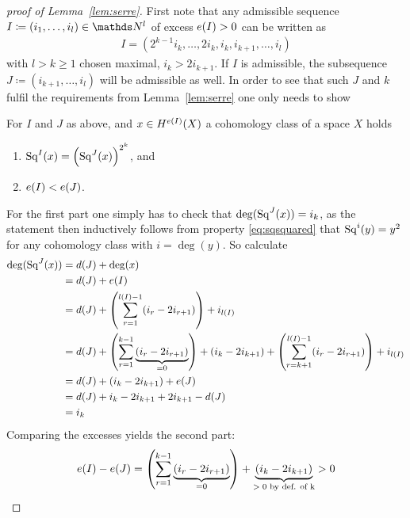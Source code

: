 \begin{proof}[proof of Lemma~\ref{lem:serre}]
  First note that any admissible sequence $I\coloneqq(i_1,\dotsc,i_l)\in\Nat^l$
  of excess $e(I)>0$ can be written as
  \begin{gather*}
    I=(2^{k-1}i_k,\dotsc,2i_k,i_k,i_{k+1},\dotsc,i_l)
  \end{gather*}
  with $l>k\geq 1$ chosen maximal, \idest $i_k>2i_{k+1}$. If $I$ is admissible, the subsequence
  $J\coloneqq(i_{k+1},\dotsc,i_l)$ will be admissible as well.
  In order to see that such $J$ and $k$ fulfil the requirements from
  Lemma~\ref{lem:serre} one only needs to show
  \begin{claim}
    For $I$ and $J$ as above, and $x\in H^{e(I)}(X)$ a cohomology
    class of a space $X$ holds
    \begin{enumerate}
    \item $\mathrm{Sq}^{I}(x) = \left(\mathrm{Sq}^{J}(x)\right)^{2^k}$, and
    \item $e(I)<e(J)$.
    \end{enumerate}
  \end{claim}
  For the first part one simply has to check that
  $\deg(\mathrm{Sq}^{J}(x))=i_k$, as the statement then inductively follows from
  property \eqref{eq:sqsquared} that $\mathrm{Sq}^{i}(y)=y^2$ for any cohomology
  class with $i=\deg(y)$.
  So calculate
  \begin{align*}
    \deg(\mathrm{Sq}^{J}(x))
    &= d(J) + \deg(x)\\
    &= d(J) + e(I)\\
    &= d(J) 
      + \left(\sum_{r=1}^{l(I)-1}(i_r-2i_{r+1})\right)
      + i_{l(I)}\\
    &= d(J)
      + \left(\sum_{r=1}^{k-1}\underbrace{(i_r-2i_{r+1})}_{=0}\right)
      + (i_k-2i_{k+1})
      +\left(\sum_{r=k+1}^{l(I)-1}(i_r-2i_{r+1})\right) + i_{l(I)}\\
    &= d(J)
      + (i_k-2i_{k+1})
      + e(J) \\
    &= d(J) + i_k - 2i_{k+1} + 2i_{k+1} - d(J) \\
    &= i_k
  \end{align*}
  Comparing the excesses yields the second part:
  \begin{gather*}
    e(I) - e(J)
    = \left(\sum_{r=1}^{k-1}\underbrace{(i_r-2i_{r+1})}_{=0}\right)
    + \underbrace{(i_k - 2i_{k+1})}_{\text{$>0$ by def. of k}}
    > 0
    \qedhere
  \end{gather*}
\end{proof}


